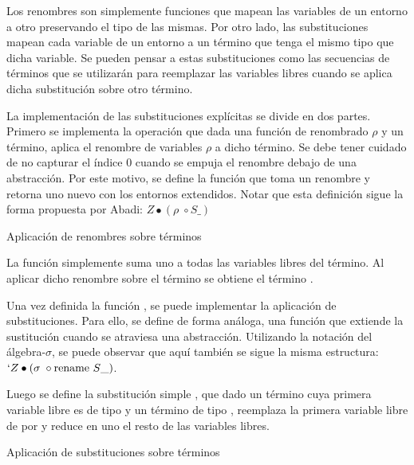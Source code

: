 
Los renombres son simplemente funciones que mapean las variables de un entorno a otro preservando el tipo de las mismas.
Por otro lado, las substituciones mapean cada variable de un entorno a un término que tenga el mismo tipo que dicha variable.
Se pueden pensar a estas substituciones como las secuencias de términos que se utilizarán para reemplazar las variables libres cuando se aplica dicha substitución sobre otro término. 

La implementación de las substituciones explícitas se divide en dos partes.
Primero se implementa la operación  que dada una función de renombrado $\rho$ y un término, aplica el renombre de variables $\rho$ a dicho término.
Se debe tener cuidado de no capturar el índice 0 cuando se empuja el renombre debajo de una abstracción.
Por este motivo, se define la función  que toma un renombre y retorna uno nuevo con los entornos extendidos.
Notar que esta definición sigue la forma propuesta por Abadi: $Z \bullet (\rho \; \circ S\_)$

\begin{codigo}
	Aplicación de renombres sobre términos
\end{codigo}

\begin{example}
	La función   simplemente suma uno a todas las variables libres del término.
	Al aplicar dicho renombre sobre el término  se obtiene el término .
	
\end{example}

Una vez definida la función , se puede implementar la aplicación de substituciones.
Para ello, se define de forma análoga, una función  que extiende la sustitución cuando se atraviesa una abstracción.
Utilizando la notación del álgebra-$\sigma$, se puede observar que aquí también se sigue la misma estructura: $`Z \bullet (\sigma \; \circ \text{rename } S\_)$.

Luego se define la substitución simple \func{$\_[\_]$}, que dado un término  cuya primera variable libre es de tipo  y un término  de tipo , reemplaza la primera variable libre de  por  y reduce en uno el resto de las variables libres.

\begin{codigo}
	Aplicación de substituciones sobre términos
\end{codigo}

